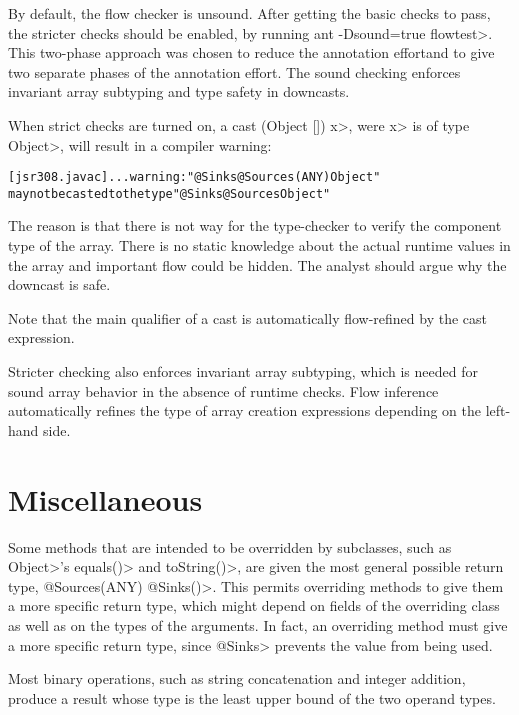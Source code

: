 By default, the flow checker is unsound.  After getting the basic checks to pass, the
 stricter checks should be enabled, by running \<ant -Dsound=true flowtest>.
This two-phase approach was chosen to reduce
the annotation effortand to give two separate phases of
the annotation effort.
 The sound checking enforces invariant 
array subtyping and type safety in downcasts.


When strict checks are turned on,
a cast \<(Object []) x>, were \<x> is of type \<Object>, will result
in a compiler warning:

\begin{alltt}
[jsr308.javac] ... warning: "@Sinks @Sources({ANY}) Object"
       may not be casted to the type "@Sinks @Sources Object"
\end{alltt}

The reason is that there is not way for the type-checker to verify
 the component type of the array. There is no static knowledge about the actual
runtime values in the array and important flow could be hidden.
The analyst should argue why the downcast is safe.

Note that the main qualifier of a cast is automatically flow-refined
by the cast expression.


\medskip

Stricter checking also enforces invariant array subtyping, which is
needed for sound array behavior in the absence of runtime checks.
Flow inference automatically refines the type of array creation
expressions depending on the left-hand side.

\section{Miscellaneous\label{sec:miscellaneous}}

Some methods that are intended to be overridden by subclasses, such as 
\<Object>'s \<equals()> and \<toString()>, are given the most general
possible return type, \<@Sources(ANY) @Sinks({})>.
This permits overriding methods to give them a more specific return type, which
might depend on fields of the overriding class as well as on the types of
the arguments.  In fact, an overriding method must give a more specific
return type, since \<@Sinks> prevents the value from being used.

Most binary operations, such as string concatenation and integer addition,
produce a result whose type is the least upper bound of the two operand types.


